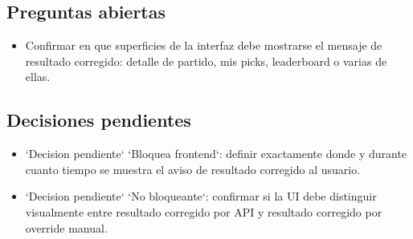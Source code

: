 \subsection{Preguntas abiertas}

\begin{itemize}
  \item Confirmar en que superficies de la interfaz debe mostrarse el mensaje de resultado corregido: detalle de partido, mis picks, leaderboard o varias de ellas.
\end{itemize}

\subsection{Decisiones pendientes}

\begin{itemize}
  \item `Decision pendiente` `Bloquea frontend`: definir exactamente donde y durante cuanto tiempo se muestra el aviso de resultado corregido al usuario.
  \item `Decision pendiente` `No bloqueante`: confirmar si la UI debe distinguir visualmente entre resultado corregido por API y resultado corregido por override manual.
\end{itemize}
